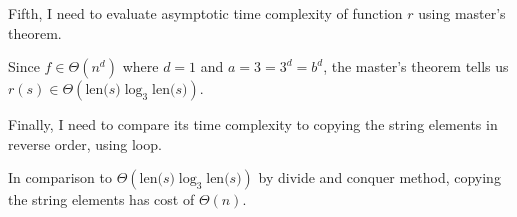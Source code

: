 \documentclass[12pt]{article}
\begin{document}
\begin{itemize}
    \bigskip

    Fifth, I need to evaluate asymptotic time complexity of function $r$ using master's theorem.

    \bigskip

    Since $f \in \Theta(n^d)$ where $d = 1$ and $a = 3 = 3^d = b^d$, the
    master's theorem tells us $r(s) \in \Theta(\text{len($s$)}\log_3 \text{len($s$)})$.

    \bigskip

    Finally, I need to compare its time complexity to copying the string
    elements in reverse order, using loop.

    \bigskip

    In comparison to $\Theta(\text{len($s$)}\log_3 \text{len($s$)})$ by
    divide and conquer method, copying the string elements has cost of $\Theta(n)$.

















\end{itemize}
\end{document}
